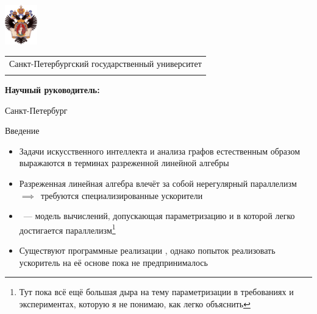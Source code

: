 \documentclass
  [ russian
  , aspectratio=169 %
  ] {beamer}
\title[Транслятор в Interaction Nets]{\my@title@title@ru}
\author[\my@title@author@ru]{\my@title@author@ru, группа \academicGroup}
\institute[СПбГУ]{}
\date[13 марта 2025 г.]{}
\makeatletter
\newcommand{\advisorChair}{\my@title@chair@ru}
\newcommand{\supervisor}{\my@title@supervisor@ru}
\newcommand{\supervisorPosition}{\my@title@supervisorPosition@ru}
\newcommand{\consultant}{\my@title@consultant@ru}
\newcommand{\consultantPosition}{\my@title@consultantPosition@ru}
\newcommand{\reviewer}{\my@title@reviewer@ru}
\newcommand{\reviewerPosition}{\my@title@reviewerPosition@ru}
\newcommand{\defenseYear}{\my@title@year@ru}
\makeatother
\begin{document}
{
\begin{frame}
    \includegraphics[width=1.4cm]{figures/SPbGU_Logo.png}
    \vspace{-35pt}
    \hspace{-10pt}
    \begin{center}
        \begin{tabular}{c}
            \scriptsize{Санкт-Петербургский государственный университет} \\
            \scriptsize{\advisorChair}
        \end{tabular}
        \titlepage
    \end{center}

    \btVFill

    {\scriptsize
        \textbf{Научный руководитель:}  \supervisorPosition~\supervisor \\
    }
    \makeatother
    \begin{center}
        \vspace{5pt}
        \scriptsize{Санкт-Петербург\\ \defenseYear}
    \end{center}
\end{frame}
}

\begin{frame}{Введение}
    \begin{itemize}
        \item Задачи искусственного интеллекта и анализа графов естественным образом выражаются в терминах разреженной линейной алгебры
        \item Разреженная линейная алгебра влечёт за собой нерегулярный параллелизм $\implies$~требуются специализированные ускорители
        \item \INs{}~--- модель вычислений, допускающая параметризацию и в которой легко достигается параллелизм\footnote[frame]{Тут пока всё ещё большая дыра на тему параметризации в требованиях и экспериментах, которую я не понимаю, как легко объяснить}
        \item Существуют программные реализации \INs{}, однако попыток реализовать ускоритель на её основе пока не предпринималось
    \end{itemize}

\end{frame}
\end{document}
